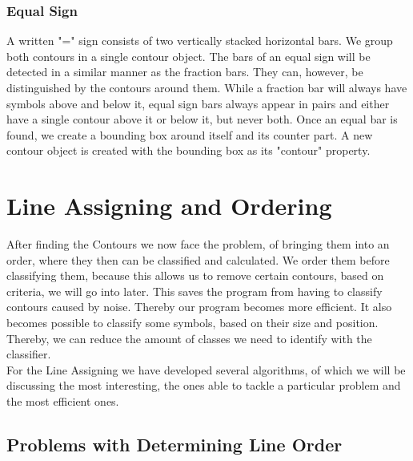 \documentclass[12pt]{article}
\begin{document}
\begin{itemize}
\begin{itemize}
\begin{itemize}
\begin{itemize}
\begin{itemize}
\begin{itemize}
\begin{itemize}
\begin{itemize}
\begin{itemize}
\begin{itemize}
	\subsubsection{Equal Sign}
	A written "=" sign consists of two vertically stacked horizontal bars. We group both contours in a single contour object.
	The bars of an equal sign will be detected in a similar manner as the fraction bars.
	They can, however, be distinguished by the contours around them.
	While a fraction bar will always have symbols above and below it, equal sign bars always appear in pairs
	and either have a single contour above it or below it, but never both.
	Once an equal bar is found, we create a bounding box around itself and its counter part.
	A new contour object is created with the bounding box as its "contour" property.


\section{Line Assigning and Ordering}
	After finding the Contours we now face the problem, of bringing them into an order, where they then can be classified and calculated.
	We order them before classifying them, because this allows us to remove certain contours, based on criteria, we will go into later.
	This saves the program from having to classify contours caused by noise.
	Thereby our program becomes more efficient.
	It also becomes possible to classify some symbols, based on their size and position.
	Thereby, we can reduce the amount of classes we need to identify with the classifier. \\
	For the Line Assigning we have developed several algorithms, of which we will be discussing the most interesting, the ones able to tackle a particular problem and the most efficient ones.
	
	\subsection{Problems with Determining Line Order}
	
	

\end{itemize}
\end{itemize}
\end{itemize}
\end{itemize}
\end{itemize}
\end{itemize}
\end{itemize}
\end{itemize}
\end{itemize}
\end{itemize}
\end{document}
